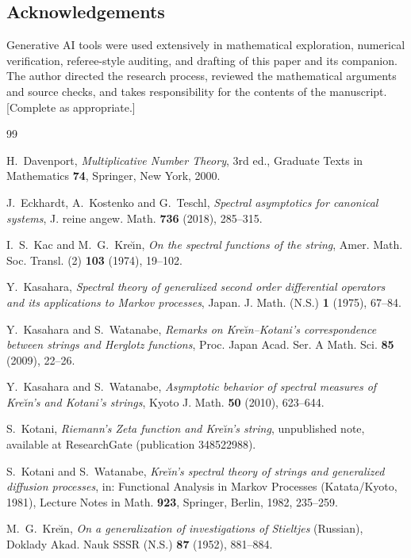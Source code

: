 \documentclass[11pt,reqno]{amsart}
\theoremstyle{plain}
\theoremstyle{definition}
\begin{document}
\subsection*{Acknowledgements}
Generative AI tools were used extensively in mathematical exploration, numerical
verification, referee-style auditing, and drafting of this paper and its companion. The
author directed the research process, reviewed the mathematical arguments and source checks,
and takes responsibility for the contents of the manuscript. [Complete as appropriate.]

\begin{thebibliography}{99}

 H.~Davenport,
\emph{Multiplicative Number Theory}, 3rd ed., Graduate Texts in Mathematics \textbf{74},
Springer, New York, 2000.

 J.~Eckhardt, A.~Kostenko and G.~Teschl,
\emph{Spectral asymptotics for canonical systems},
J. reine angew. Math. \textbf{736} (2018), 285--315.

 I.~S.~Kac and M.~G.~Kre\u\i n,
\emph{On the spectral functions of the string},
Amer. Math. Soc. Transl. (2) \textbf{103} (1974), 19--102.

 Y.~Kasahara,
\emph{Spectral theory of generalized second order differential operators and its applications
to Markov processes}, Japan. J. Math. (N.S.) \textbf{1} (1975), 67--84.

 Y.~Kasahara and S.~Watanabe,
\emph{Remarks on Kre\u\i n--Kotani's correspondence between strings and Herglotz functions},
Proc. Japan Acad. Ser. A Math. Sci. \textbf{85} (2009), 22--26.

 Y.~Kasahara and S.~Watanabe,
\emph{Asymptotic behavior of spectral measures of Kre\u\i n's and Kotani's strings},
Kyoto J. Math. \textbf{50} (2010), 623--644.

 S.~Kotani,
\emph{Riemann's Zeta function and Kre\u\i n's string}, unpublished note, available at
ResearchGate (publication 348522988).

 S.~Kotani and S.~Watanabe,
\emph{Kre\u\i n's spectral theory of strings and generalized diffusion processes},
in: Functional Analysis in Markov Processes (Katata/Kyoto, 1981), Lecture Notes in Math.
\textbf{923}, Springer, Berlin, 1982, 235--259.

 M.~G.~Kre\u\i n,
\emph{On a generalization of investigations of Stieltjes} (Russian),
Doklady Akad. Nauk SSSR (N.S.) \textbf{87} (1952), 881--884.


\end{thebibliography}
\end{document}

